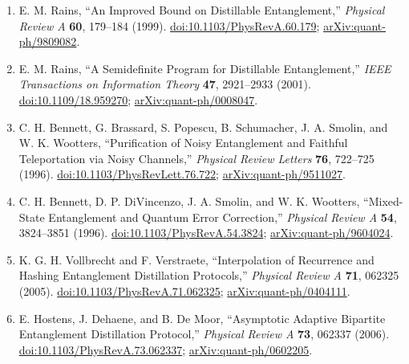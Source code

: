 \begin{enumerate}[label={},leftmargin=4.8em,labelsep=0.5em]
  \footnotesize
  \item[\textup{[Rai99]}]\label{ref:p3-rains-1999}
  E. M. Rains, ``An Improved Bound on Distillable Entanglement,''
  \emph{Physical Review A} \textbf{60}, 179--184 (1999).
  \href{https://doi.org/10.1103/PhysRevA.60.179}{doi:10.1103/PhysRevA.60.179};
  \href{https://arxiv.org/abs/quant-ph/9809082}{arXiv:quant-ph/9809082}.

  \item[\textup{[Rai01]}]\label{ref:p3-rains-2001}
  E. M. Rains, ``A Semidefinite Program for Distillable Entanglement,''
  \emph{IEEE Transactions on Information Theory} \textbf{47}, 2921--2933
  (2001). \href{https://doi.org/10.1109/18.959270}{doi:10.1109/18.959270};
  \href{https://arxiv.org/abs/quant-ph/0008047}{arXiv:quant-ph/0008047}.

  \item[\textup{[BBP+96]}]\label{ref:p3-bennett-prl}
  C. H. Bennett, G. Brassard, S. Popescu, B. Schumacher, J. A. Smolin, and
  W. K. Wootters, ``Purification of Noisy Entanglement and Faithful
  Teleportation via Noisy Channels,'' \emph{Physical Review Letters}
  \textbf{76}, 722--725 (1996).
  \href{https://doi.org/10.1103/PhysRevLett.76.722}{doi:10.1103/PhysRevLett.76.722};
  \href{https://arxiv.org/abs/quant-ph/9511027}{arXiv:quant-ph/9511027}.

  \item[\textup{[BDSW96]}]\label{ref:p3-bennett-pra}
  C. H. Bennett, D. P. DiVincenzo, J. A. Smolin, and W. K. Wootters,
  ``Mixed-State Entanglement and Quantum Error Correction,''
  \emph{Physical Review A} \textbf{54}, 3824--3851 (1996).
  \href{https://doi.org/10.1103/PhysRevA.54.3824}{doi:10.1103/PhysRevA.54.3824};
  \href{https://arxiv.org/abs/quant-ph/9604024}{arXiv:quant-ph/9604024}.

  \item[\textup{[VV05]}]\label{ref:p3-vollbrecht}
  K. G. H. Vollbrecht and F. Verstraete, ``Interpolation of Recurrence and
  Hashing Entanglement Distillation Protocols,'' \emph{Physical Review A}
  \textbf{71}, 062325 (2005).
  \href{https://doi.org/10.1103/PhysRevA.71.062325}{doi:10.1103/PhysRevA.71.062325};
  \href{https://arxiv.org/abs/quant-ph/0404111}{arXiv:quant-ph/0404111}.

  \item[\textup{[HDM06]}]\label{ref:p3-hostens}
  E. Hostens, J. Dehaene, and B. De Moor, ``Asymptotic Adaptive Bipartite
  Entanglement Distillation Protocol,'' \emph{Physical Review A} \textbf{73},
  062337 (2006).
  \href{https://doi.org/10.1103/PhysRevA.73.062337}{doi:10.1103/PhysRevA.73.062337};
  \href{https://arxiv.org/abs/quant-ph/0602205}{arXiv:quant-ph/0602205}.


\end{enumerate}
